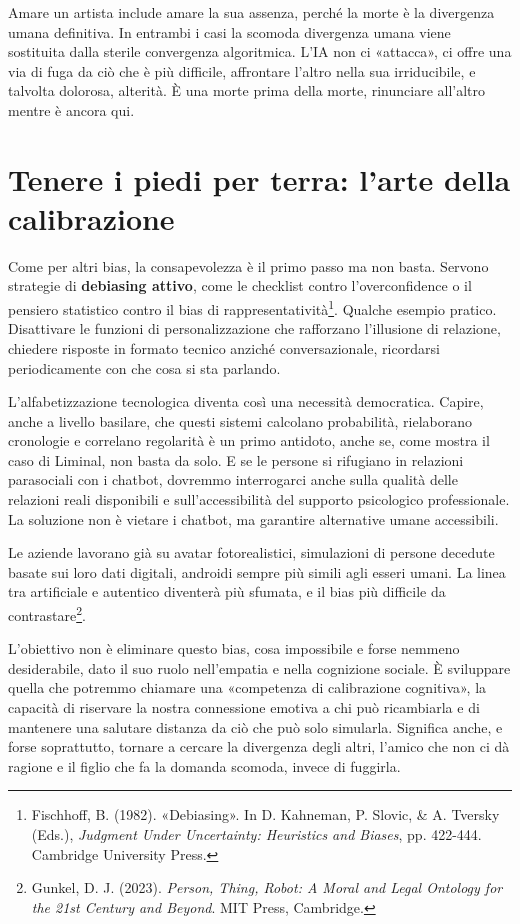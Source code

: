 Amare un artista include amare la sua assenza, perché la morte è la divergenza umana definitiva. In entrambi i casi la scomoda divergenza umana viene sostituita dalla sterile convergenza algoritmica. L'IA non ci «attacca», ci offre una via di fuga da ciò che è più difficile, affrontare l'altro nella sua irriducibile, e talvolta dolorosa, alterità. È una morte prima della morte, rinunciare all'altro mentre è ancora qui.

\section{Tenere i piedi per terra: l'arte della calibrazione}
\label{sec:p3c35-come-tenere-i}
Come per altri bias, la consapevolezza è il primo passo ma non basta. Servono strategie di \textbf{debiasing attivo}, come le checklist contro l'overconfidence o il pensiero statistico contro il bias di rappresentatività\footnote{Fischhoff, B. (1982). «Debiasing». In D. Kahneman, P. Slovic, \& A. Tversky (Eds.), \textit{Judgment Under Uncertainty: Heuristics and Biases}, pp. 422-444. Cambridge University Press.}. Qualche esempio pratico. Disattivare le funzioni di personalizzazione che rafforzano l'illusione di relazione, chiedere risposte in formato tecnico anziché conversazionale, ricordarsi periodicamente con che cosa si sta parlando.

L'alfabetizzazione tecnologica diventa così una necessità democratica. Capire, anche a livello basilare, che questi sistemi calcolano probabilità, rielaborano cronologie e correlano regolarità è un primo antidoto, anche se, come mostra il caso di Liminal, non basta da solo. E se le persone si rifugiano in relazioni parasociali con i chatbot, dovremmo interrogarci anche sulla qualità delle relazioni reali disponibili e sull'accessibilità del supporto psicologico professionale. La soluzione non è vietare i chatbot, ma garantire alternative umane accessibili.

\label{sec:p3c35-il-futuro-e}
Le aziende lavorano già su avatar fotorealistici, simulazioni di persone decedute basate sui loro dati digitali, androidi sempre più simili agli esseri umani. La linea tra artificiale e autentico diventerà più sfumata, e il bias più difficile da contrastare\footnote{Gunkel, D. J. (2023). \textit{Person, Thing, Robot: A Moral and Legal Ontology for the 21st Century and Beyond}. MIT Press, Cambridge.}.

L'obiettivo non è eliminare questo bias, cosa impossibile e forse nemmeno desiderabile, dato il suo ruolo nell'empatia e nella cognizione sociale. È sviluppare quella che potremmo chiamare una «competenza di calibrazione cognitiva», la capacità di riservare la nostra connessione emotiva a chi può ricambiarla e di mantenere una salutare distanza da ciò che può solo simularla. Significa anche, e forse soprattutto, tornare a cercare la divergenza degli altri, l'amico che non ci dà ragione e il figlio che fa la domanda scomoda, invece di fuggirla.

